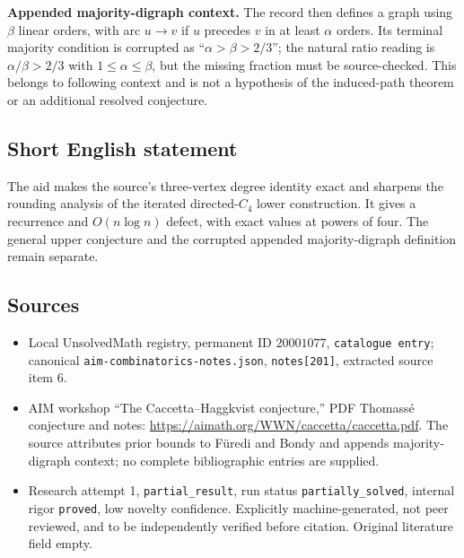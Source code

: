 \documentclass[11pt]{article}
\begin{document}
\textbf{Appended majority-digraph context.} The record then defines a graph using $\beta$ linear orders, with arc $u\to v$ if $u$ precedes $v$ in at least $\alpha$ orders. Its terminal majority condition is corrupted as ``$\alpha>\beta>2/3$''; the natural ratio reading is $\alpha/\beta>2/3$ with $1\leq\alpha\leq\beta$, but the missing fraction must be source-checked. This belongs to following context and is not a hypothesis of the induced-path theorem or an additional resolved conjecture.
\subsection{Short English statement}
The aid makes the source's three-vertex degree identity exact and sharpens the rounding analysis of the iterated directed-$C_4$ lower construction. It gives a recurrence and $O(n\log n)$ defect, with exact values at powers of four. The general upper conjecture and the corrupted appended majority-digraph definition remain separate.
\subsection{Sources}
\begin{itemize}
\item Local UnsolvedMath registry, permanent ID $20001077$, \texttt{catalogue entry}; canonical \texttt{aim-combinatorics-notes.json}, \texttt{notes[201]}, extracted source item 6.
\item AIM workshop ``The Caccetta--Haggkvist conjecture,'' PDF Thomass\'e conjecture and notes: \url{https://aimath.org/WWN/caccetta/caccetta.pdf}. The source attributes prior bounds to F\"uredi and Bondy and appends majority-digraph context; no complete bibliographic entries are supplied.
\item Research attempt 1, \texttt{partial\_result}, run status \texttt{partially\_solved}, internal rigor \texttt{proved}, low novelty confidence. Explicitly machine-generated, not peer reviewed, and to be independently verified before citation. Original literature field empty.
\end{itemize}
\end{document}

